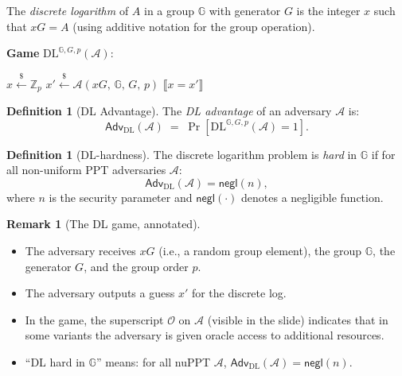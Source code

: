 \documentclass[11pt]{article}
\theoremstyle{plain}
\theoremstyle{definition}
\newtheorem{definition}[theorem]{Definition}
\newtheorem{remark}[theorem]{Remark}
\newcommand{\Adv}{\mathsf{Adv}}
\newcommand{\negl}{\mathsf{negl}}
\begin{document}
The \emph{discrete logarithm} of $A$ in a group $\mathbb{G}$ with generator $G$ is the
integer $x$ such that $xG = A$ (using additive notation for the group operation).

\begin{tcolorbox}[colback=gray!10!white, colframe=gray!60!black,
  title=Discrete Logarithm (DL) Security Game]
\textbf{Game} $\mathrm{DL}^{\mathbb{G},G,p}(\mathcal{A})$:

\medskip
\begin{algorithmic}[1]
  \State $x \xleftarrow{\$} \mathbb{Z}_p$ 
  \State $x' \xleftarrow{\$} \mathcal{A}(xG,\, \mathbb{G},\, G,\, p)$
  \State \Return $\llbracket x = x' \rrbracket$
\end{algorithmic}
\end{tcolorbox}

\begin{definition}[DL Advantage]
The \emph{DL advantage} of an adversary $\mathcal{A}$ is:
\[
  \Adv_{\mathrm{DL}}(\mathcal{A})
  \;=\;
  \Pr\!\left[\mathrm{DL}^{\mathbb{G},G,p}(\mathcal{A}) = 1\right].
\]
\end{definition}

\begin{definition}[DL-hardness]
The discrete logarithm problem is \emph{hard} in $\mathbb{G}$ if for all
non-uniform PPT adversaries $\mathcal{A}$:
\[
  \Adv_{\mathrm{DL}}(\mathcal{A}) = \negl(n),
\]
where $n$ is the security parameter and $\negl(\cdot)$ denotes a negligible function.
\end{definition}

\begin{remark}[The DL game, annotated]
\hfill
\begin{itemize}
  \item The adversary receives $xG$ (i.e., a random group element), the group $\mathbb{G}$,
        the generator $G$, and the group order $p$.
  \item The adversary outputs a guess $x'$ for the discrete log.
  \item In the game, the superscript $\mathcal{O}$ on $\mathcal{A}$ (visible in the slide)
        indicates that in some variants the adversary is given oracle access to additional
        resources.
  \item ``DL hard in $\mathbb{G}$'' means: for all nuPPT $\mathcal{A}$,
        $\Adv_{\mathrm{DL}}(\mathcal{A}) = \negl(n)$.
\end{itemize}
\end{remark}
\end{document}
